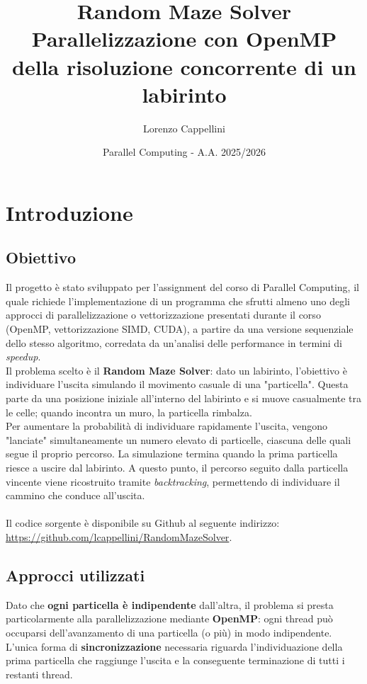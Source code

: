 \documentclass{article}
\title{Random Maze Solver \\ \vspace{0.5cm} {Parallelizzazione con OpenMP della risoluzione concorrente di un labirinto}}
\author{Lorenzo Cappellini}
\date{Parallel Computing - A.A. 2025/2026}
\begin{document}
\maketitle

\newpage

\tableofcontents

\newpage
\section{Introduzione}

\subsection{Obiettivo}
Il progetto è stato sviluppato per l'assignment del corso di Parallel Computing, il quale richiede l'implementazione di un programma che sfrutti almeno uno degli approcci di parallelizzazione o vettorizzazione presentati durante il corso (OpenMP, vettorizzazione SIMD, CUDA), a partire da una versione sequenziale dello stesso algoritmo, corredata da un'analisi delle performance in termini di \textit{speedup}.
\\

\noindent Il problema scelto è il \textbf{Random Maze Solver}: dato un labirinto, l'obiettivo è individuare l'uscita simulando il movimento casuale di una "particella". Questa parte da una posizione iniziale all'interno del labirinto e si muove casualmente tra le celle; quando incontra un muro, la particella rimbalza.\\
Per aumentare la probabilità di individuare rapidamente l'uscita, vengono "lanciate" simultaneamente un numero elevato di particelle, ciascuna delle quali segue il proprio percorso. La simulazione termina quando la prima particella riesce a uscire dal labirinto. A questo punto, il percorso seguito dalla particella vincente viene ricostruito tramite \textit{backtracking}, permettendo di individuare il cammino che conduce all'uscita.\\
\\

\noindent Il codice sorgente è disponibile su Github al seguente indirizzo:\\
\href{https://github.com/lcappellini/RandomMazeSolver}{https://github.com/lcappellini/RandomMazeSolver}.

\subsection{Approcci utilizzati}
Dato che \textbf{ogni particella è indipendente} dall'altra, il problema si presta particolarmente alla parallelizzazione mediante \textbf{OpenMP}: ogni thread può occuparsi dell'avanzamento di una particella (o più) in modo indipendente.\\
L'unica forma di \textbf{sincronizzazione} necessaria riguarda l'individuazione della prima particella che raggiunge l'uscita e la conseguente terminazione di tutti i restanti thread.
\\
\end{document}
